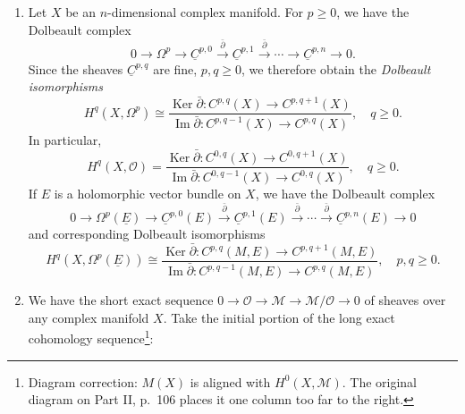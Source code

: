 \begin{enumerate}[start=3]
We showed in Example 3 that $H^p(X,\mathbb C)\cong H^p_{\mathrm{sing}}(X,\mathbb C)$ and we shall now describe an explicit isomorphism between $H^p_{\mathrm{DR}}(X,\mathbb C)$ and $H^p_{\mathrm{sing}}(X,\mathbb C)$. For $p\geq0$ we define a sheaf morphism $I^p:\underline C^p\to\underline S^p(\mathbb C)$ by integration of chains:
\[
I^p(f)(c)=\int_c f,\quad f\in C^p(U),\quad c\in S_p(U,\mathbb C).
\]
By Stokes' theorem, we see that $I^p$ commutes with the differentials $d$, $D$ and so we obtain a commutative ladder of exact sequences:
\[

\]
The morphisms $I^p$ induce the de Rham isomorphisms between $H^p_{\mathrm{DR}}(X,\mathbb C)$ and $H^p_{\mathrm{sing}}(X,\mathbb C)$.

Finally we should point out that the de Rham isomorphisms actually give an \emph{algebra} isomorphism between the de Rham and singular cohomology groups (the algebra structure on the de Rham and singular cohomology groups is given by wedge and cup product respectively). The reader may find a proof of this stronger statement in Warner \cite{bib:II:warner-f-w:1}.
\item Let $X$ be an $n$-dimensional complex manifold. For $p\geq0$, we have the Dolbeault complex
\[
0\to\Omega^p\to\underline C^{p,0}\xrightarrow{\bar\partial}\underline C^{p,1}\xrightarrow{\bar\partial}\cdots\to\underline C^{p,n}\to0.
\]
Since the sheaves $\underline C^{p,q}$ are fine, $p,q\geq0$, we therefore obtain the \emph{Dolbeault isomorphisms}
\[
H^q(X,\Omega^p)\cong\frac{\operatorname{Ker}\bar\partial:C^{p,q}(X)\to C^{p,q+1}(X)}{\operatorname{Im}\bar\partial:C^{p,q-1}(X)\to C^{p,q}(X)},\quad q\geq0.
\]
In particular,
\[
H^q(X,\mathcal O)=\frac{\operatorname{Ker}\bar\partial:C^{0,q}(X)\to C^{0,q+1}(X)}{\operatorname{Im}\bar\partial:C^{0,q-1}(X)\to C^{0,q}(X)},\quad q\geq0.
\]
If $E$ is a holomorphic vector bundle on $X$, we have the Dolbeault complex
\[
0\to\Omega^p(\underline E)\to\underline C^{p,0}(E)\xrightarrow{\bar\partial}\underline C^{p,1}(E)\xrightarrow{\bar\partial}\cdots\xrightarrow{\bar\partial}\underline C^{p,n}(E)\to0
\]
and corresponding Dolbeault isomorphisms
\[
H^q(X,\Omega^p(\underline E))\cong\frac{\operatorname{Ker}\bar\partial:C^{p,q}(M,E)\to C^{p,q+1}(M,E)}{\operatorname{Im}\bar\partial:C^{p,q-1}(M,E)\to C^{p,q}(M,E)},\quad p,q\geq0.
\]
\item We have the short exact sequence $0\to\mathcal O\to\mathcal M\to\mathcal M/\mathcal O\to0$ of sheaves over any complex manifold $X$. Take the initial portion of the long exact cohomology sequence\footnote{Diagram correction: $M(X)$ is aligned with $H^0(X,\mathcal M)$. The original diagram on Part II, p.~106 places it one column too far to the right.}:

\end{enumerate}
